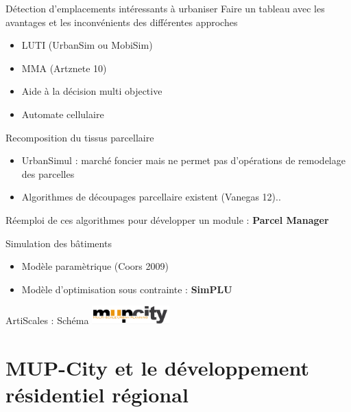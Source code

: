 \documentclass[xcolor=table]{beamer}
\begin{document}
\begin{frame}{Détection d'emplacements intéressants à urbaniser}
Faire un tableau avec les avantages et les inconvénients des différentes approches
	\begin{itemize}
		\item LUTI (UrbanSim ou MobiSim)
		\item MMA (Artznete 10)
		\item Aide à la décision multi objective
		\item Automate cellulaire
	\end{itemize}
\end{frame}

\begin{frame}{Recomposition du tissus parcellaire}
	\begin{itemize}
		\item UrbanSimul : marché foncier mais ne permet pas d'opérations de remodelage des parcelles
		\item Algorithmes de découpages parcellaire	existent (Vanegas 12).. 
	\end{itemize}
	\begin{block}{}
		Réemploi de ces algorithmes pour développer un module : \textbf{Parcel Manager}
	\end{block}
\end{frame}

\begin{frame}{Simulation des bâtiments}
	\begin{itemize}
		\item Modèle paramètrique (Coors 2009)
		\item Modèle d'optimisation sous contrainte	: \textbf{SimPLU}
	\end{itemize}
\end{frame}

\begin{frame}{ArtiScales : Schéma}
	\includegraphics[width=3cm]{Images/mup.png}
\end{frame}




\section[MUP-City]{MUP-City et le développement résidentiel régional}
\end{document}
